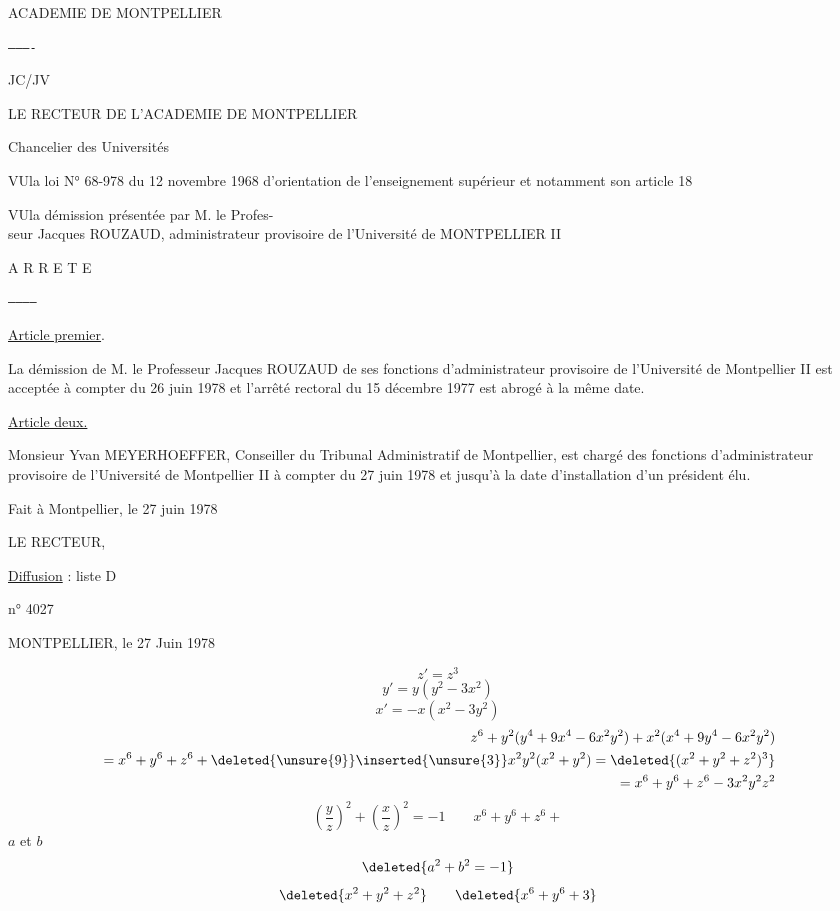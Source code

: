 ACADEMIE DE MONTPELLIER

\texttt{----------}

JC/JV

LE RECTEUR DE L'ACADEMIE DE MONTPELLIER

Chancelier des Universités

VU\qquad la loi N° 68-978 du 12 novembre 1968
d'orientation de l'enseignement supérieur
et notamment son article 18

VU\qquad la démission présentée par M. le Profes-\\
seur Jacques ROUZAUD, administrateur
provisoire de l'Université de
MONTPELLIER II

A R R E T E

\texttt{-----------}

\uline{Article premier}.

La démission de M. le Professeur Jacques ROUZAUD
de ses fonctions d'administrateur provisoire de
l'Université de Montpellier II est acceptée à compter
du 26 juin 1978 et l'arrêté rectoral du 15 décembre
1977 est abrogé à la même date.

\uline{Article deux.}

Monsieur Yvan MEYERHOEFFER, Conseiller du Tribunal
Administratif de Montpellier, est chargé des fonctions
d'administrateur provisoire de l'Université de
Montpellier II à compter du 27 juin 1978 et jusqu'à
la date d'installation d'un président élu.

Fait à Montpellier, le 27 juin 1978

LE RECTEUR,


\uline{Diffusion} : liste D

n° 4027

MONTPELLIER, le 27 Juin 1978

\[
z'=z^3
\]
\[
y'=y(y^2-3x^2)
\]
\[
x'=-x(x^2-3y^2)
\]
\[
\begin{aligned}
z^6+y^2(y^4+9x^4-6x^2y^2)+x^2(x^4+9y^4-6x^2y^2)\\
{}=x^6+y^6+z^6+\deleted{\unsure{9}}\inserted{\unsure{3}}x^2y^2(x^2+y^2)
=\deleted{(x^2+y^2+z^2)^3}\\
{}=x^6+y^6+z^6-3x^2y^2z^2
\end{aligned}
\]
\[
\left(\frac yz\right)^2+\left(\frac xz\right)^2=-1
\qquad x^6+y^6+z^6+
\]
$a$ et $b$
\[
\deleted{a^2+b^2=-1}
\]
\[
\deleted{x^2+y^2+z^2}\qquad\deleted{x^6+y^6+3}
\]


